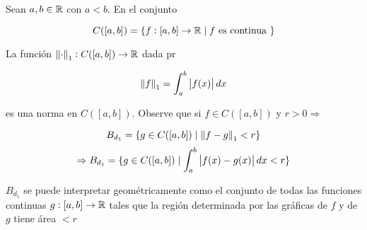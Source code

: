 \begin{eg}
    Sean $a,b \in \mathbb{R}$ con $a < b$. En el conjunto 

    \begin{equation*}
        C([a,b]) = \{ f : [a,b] \to \mathbb{R} \mid f \text{ es continua }\}
    \end{equation*}

    La función ${\norm{\cdot}}_{1} : C([a,b]) \to \mathbb{R}$ dada pr

    \begin{equation*}
        {\norm{f}}_{1} = \int_{a}^{b} \abs{f(x)} \, dx
    \end{equation*}

    es una norma en $C([a,b])$. Observe que si $f\in C([a,b])$ y $r > 0 \Rightarrow$

    \begin{equation*}
        B_{d_{1}} = \{ g \in C([a,b]) \mid {\norm{f-g}}_{1} < r \}
    \end{equation*}
    \begin{equation*}
        \Rightarrow  B_{d_{1}}  =  \{ g \in C([a,b]) \mid \int_{a}^{b} \abs{f(x)-g(x)} \, dx < r \}
    \end{equation*}
    
\begin{center}
\end{center}

$B_{d_{1}}$ se puede interpretar geométricamente como el conjunto de todas las funciones continuas $g : [a,b] \to \mathbb{R}$ tales que la región determinada por las gráficas de $f$ y de $g$ tiene área $< r$
\end{eg}

